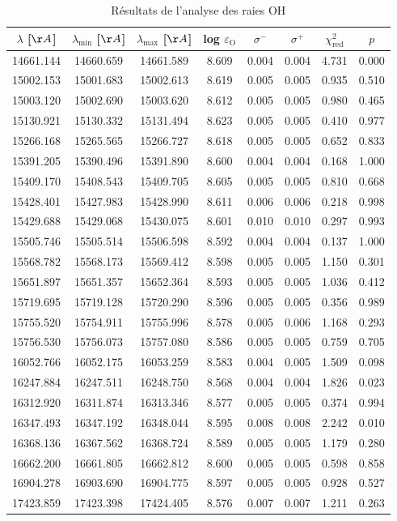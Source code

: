 \begin{table}
\centering
\caption{Résultats de l'analyse des raies OH}
\label{tab:resultats_OH}
\begin{tabular}{cccccccc}
\toprule
\midrule
$\lambda$ [$\AA$] & $\lambda_{\mathrm{min}}$ [$\AA$] & $\lambda_{\mathrm{max}}$ [$\AA$] & log $\varepsilon_{\mathrm{O}}$ & $\sigma^{-}$ & $\sigma^{+}$ & $\chi^2_{\mathrm{red}}$ & $p$ \\
\midrule
14661.144 & 14660.659 & 14661.589 & 8.609 & 0.004 & 0.004 & 4.731 & 0.000 \\
15002.153 & 15001.683 & 15002.613 & 8.619 & 0.005 & 0.005 & 0.935 & 0.510 \\
15003.120 & 15002.690 & 15003.620 & 8.612 & 0.005 & 0.005 & 0.980 & 0.465 \\
15130.921 & 15130.332 & 15131.494 & 8.623 & 0.005 & 0.005 & 0.410 & 0.977 \\
15266.168 & 15265.565 & 15266.727 & 8.618 & 0.005 & 0.005 & 0.652 & 0.833 \\
15391.205 & 15390.496 & 15391.890 & 8.600 & 0.004 & 0.004 & 0.168 & 1.000 \\ 
15409.170 & 15408.543 & 15409.705 & 8.605 & 0.005 & 0.005 & 0.810 & 0.668 \\
15428.401 & 15427.983 & 15428.990 & 8.611 & 0.006 & 0.006 & 0.218 & 0.998 \\
15429.688 & 15429.068 & 15430.075 & 8.601 & 0.010 & 0.010 & 0.297 & 0.993 \\
15505.746 & 15505.514 & 15506.598 & 8.592 & 0.004 & 0.004 & 0.137 & 1.000 \\
15568.782 & 15568.173 & 15569.412 & 8.598 & 0.005 & 0.005 & 1.150 & 0.301 \\
15651.897 & 15651.357 & 15652.364 & 8.593 & 0.005 & 0.005 & 1.036 & 0.412 \\
15719.695 & 15719.128 & 15720.290 & 8.596 & 0.005 & 0.005 & 0.356 & 0.989 \\
15755.520 & 15754.911 & 15755.996 & 8.578 & 0.005 & 0.006 & 1.168 & 0.293 \\
15756.530 & 15756.073 & 15757.080 & 8.586 & 0.005 & 0.005 & 0.759 & 0.705 \\
16052.766 & 16052.175 & 16053.259 & 8.583 & 0.004 & 0.005 & 1.509 & 0.098 \\
16247.884 & 16247.511 & 16248.750 & 8.568 & 0.004 & 0.004 & 1.826 & 0.023 \\
16312.920 & 16311.874 & 16313.346 & 8.577 & 0.005 & 0.005 & 0.374 & 0.994 \\
16347.493 & 16347.192 & 16348.044 & 8.595 & 0.008 & 0.008 & 2.242 & 0.010 \\
16368.136 & 16367.562 & 16368.724 & 8.589 & 0.005 & 0.005 & 1.179 & 0.280 \\
16662.200 & 16661.805 & 16662.812 & 8.600 & 0.005 & 0.005 & 0.598 & 0.858 \\
16904.278 & 16903.690 & 16904.775 & 8.597 & 0.005 & 0.005 & 0.928 & 0.527 \\
17423.859 & 17423.398 & 17424.405 & 8.576 & 0.007 & 0.007 & 1.211 & 0.263 \\
\bottomrule
\end{tabular}
\end{table}
